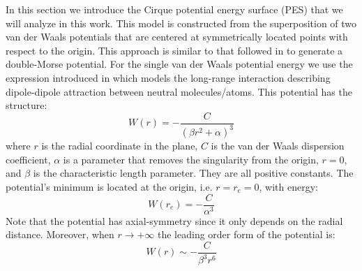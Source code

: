 \documentclass[10pt,aps,onecolumn,superscriptaddress]{revtex4-2}
\begin{document}
In this section we introduce the Cirque potential energy surface (PES) that we will analyze in this work. This model is constructed from the superposition of two van der Waals potentials that are centered at symmetrically located points with respect to the origin. This approach is similar to that followed in \cite{GonzalezMontoya2020} to generate a double-Morse potential. For the single van der Waals potential energy we use the expression introduced in \cite{Soley2018} which models the long-range interaction describing dipole-dipole attraction between neutral molecules/atoms. This potential has the structure: 
\begin{equation}
W(r) = -\dfrac{C}{(\beta r^2 + \alpha)^3}
\label{eq:vdw-single}
\end{equation}
where $r$ is the radial coordinate in the plane, $C$ is the van der Waals dispersion coefficient, $\alpha$ is a parameter that removes the singularity from the origin, $r = 0$, and $\beta$ is the characteristic length parameter. They are all positive constants. The potential's minimum is located at the origin, i.e. $r = r_e = 0$, with energy: 
\begin{equation}
W\left(r_e\right) = - \dfrac{C}{\alpha^3}
\end{equation}
Note that the potential has axial-symmetry since it only depends on the radial distance. Moreover, when $r \rightarrow + \infty$ the leading order form of the potential is:
\begin{equation}
W(r) \sim - \frac{C}{\beta^3 r^6}
\end{equation}
\end{document}
